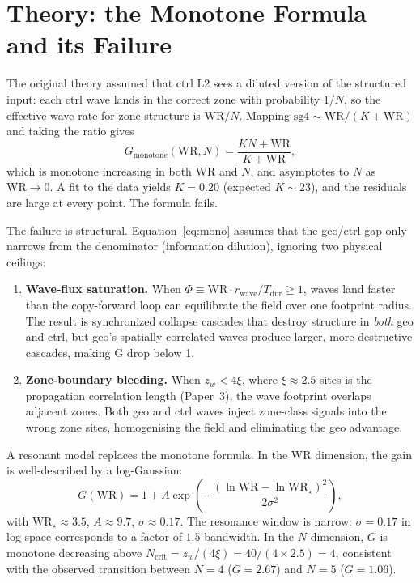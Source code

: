 \documentclass[11pt]{article}
\begin{document}
\section{Theory: the Monotone Formula and its Failure}

The original theory assumed that ctrl L2 sees a diluted version of the structured
input: each ctrl wave lands in the correct zone with probability $1/N$, so the
effective wave rate for zone structure is $\mathrm{WR}/N$. Mapping $\mathrm{sg4} \sim
\mathrm{WR}/(K + \mathrm{WR})$ and taking the ratio gives
\begin{equation}
  G_{\mathrm{monotone}}(\mathrm{WR}, N) = \frac{K N + \mathrm{WR}}{K + \mathrm{WR}},
  \label{eq:mono}
\end{equation}
which is monotone increasing in both WR and $N$, and asymptotes to $N$ as $\mathrm{WR} \to 0$.
A fit to the data yields $K = 0.20$ (expected $K \sim 23$), and the residuals are
large at every point. The formula fails.

The failure is structural. Equation~\eqref{eq:mono} assumes that the geo/ctrl gap only
narrows from the denominator (information dilution), ignoring two physical ceilings:
\begin{enumerate}
  \item \textbf{Wave-flux saturation.} When $\Phi \equiv \mathrm{WR} \cdot r_{\mathrm{wave}} / T_{\mathrm{dur}} \geq 1$,
    waves land faster than the copy-forward loop can equilibrate the field over one
    footprint radius. The result is synchronized collapse cascades that destroy structure in
    \emph{both} geo and ctrl, but geo's spatially correlated waves produce larger, more
    destructive cascades, making G drop below 1.
  \item \textbf{Zone-boundary bleeding.} When $z_w < 4\xi$, where $\xi \approx 2.5$
    sites is the propagation correlation length (Paper~3), the wave footprint overlaps
    adjacent zones. Both geo and ctrl waves inject zone-class signals into the wrong
    zone sites, homogenising the field and eliminating the geo advantage.
\end{enumerate}
A resonant model replaces the monotone formula. In the WR dimension, the gain is
well-described by a log-Gaussian:
\begin{equation}
  G(\mathrm{WR}) = 1 + A \exp\!\left(-\frac{(\ln \mathrm{WR} - \ln \mathrm{WR}_\star)^2}{2\sigma^2}\right),
  \label{eq:peaked}
\end{equation}
with $\mathrm{WR}_\star \approx 3.5$, $A \approx 9.7$, $\sigma \approx 0.17$.
The resonance window is narrow: $\sigma = 0.17$ in log space corresponds to a factor-of-$1.5$
bandwidth. In the $N$ dimension, $G$ is monotone decreasing above $N_{\mathrm{crit}} = z_w / (4\xi) = 40 / (4 \times 2.5) = 4$, consistent with the observed transition between $N=4$ ($G = 2.67$) and $N=5$ ($G = 1.06$).
\end{document}
